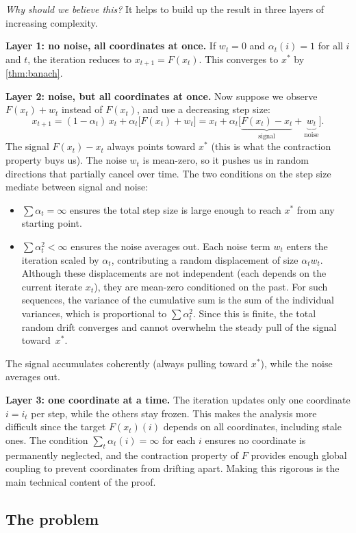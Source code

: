 \documentclass[11pt]{article}
\begin{document}
\emph{Why should we believe this?}
It helps to build up the result in three layers of increasing complexity.

\textbf{Layer 1: no noise, all coordinates at once.}
If $w_t = 0$ and $\alpha_t(i) = 1$ for all $i$ and $t$, the iteration reduces to $x_{t+1} = F(x_t)$. This converges to $x^*$ by \cref{thm:banach}.

\textbf{Layer 2: noise, but all coordinates at once.}
Now suppose we observe $F(x_t) + w_t$ instead of $F(x_t)$, and use a decreasing step size:
$$
x_{t+1} = (1 - \alpha_t)\,x_t + \alpha_t\bigl[F(x_t) + w_t\bigr] = x_t + \alpha_t\bigl[\underbrace{F(x_t) - x_t}_{\text{signal}} + \underbrace{w_t}_{\text{noise}}\bigr].
$$
The signal $F(x_t) - x_t$ always points toward $x^*$ (this is what the contraction property buys us). The noise $w_t$ is mean-zero, so it pushes us in random directions that partially cancel over time. The two conditions on the step size mediate between signal and noise:
\begin{itemize}
\item $\sum \alpha_t = \infty$ ensures the total step size is large enough to reach $x^*$ from any starting point.
\item $\sum \alpha_t^2 < \infty$ ensures the noise averages out. Each noise term $w_t$ enters the iteration scaled by $\alpha_t$, contributing a random displacement of size $\alpha_t w_t$. Although these displacements are not independent (each depends on the current iterate $x_t$), they are mean-zero conditioned on the past. For such sequences, the variance of the cumulative sum is the sum of the individual variances, which is proportional to $\sum \alpha_t^2$. Since this is finite, the total random drift converges and cannot overwhelm the steady pull of the signal toward~$x^*$.
\end{itemize}
The signal accumulates coherently (always pulling toward $x^*$), while the noise averages out.

\textbf{Layer 3: one coordinate at a time.}
The iteration updates only one coordinate $i = i_t$ per step, while the others stay frozen. This makes the analysis more difficult since the target $F(x_t)(i)$ depends on all coordinates, including stale ones. The condition $\sum_t \alpha_t(i) = \infty$ for each $i$ ensures no coordinate is permanently neglected, and the contraction property of $F$ provides enough global coupling to prevent coordinates from drifting apart. Making this rigorous is the main technical content of the proof.

\subsection*{The problem}
\end{document}
